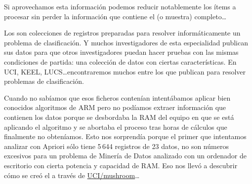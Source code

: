 Si aprovechamos esta información podemos reducir notablemente los ítems a procesar sin perder la información que contiene el \catalogo (o muestra) completo\ldots








%
%
%
%
%
%
%
%
%
%
%
%










Los \catalogos son colecciones de registros preparadas para resolver informáticamente un problema de clasificación. Y muchos investigadores de esta especialidad publican sus datos para que otros investigadores puedan hacer pruebas con las mismas condiciones de partida: una colección de datos con ciertas características. En UCI, KEEL, LUCS\ldots encontraremos muchos \catalogos entre los \datasets que publican para resolver problemas de clasificación.

Cuando no sabíamos que esos ficheros contenían \catalogos intentábamos aplicar bien conocidos algoritmos de ARM pero no podíamos extraer información que contienen los datos porque se desbordaba la RAM del equipo en que se está aplicando el algoritmo y se abortaba el proceso tras horas de cálculos que finalmente no obteníamos. Esto nos sorprendía porque el primer \catalogos que intentamos analizar con Apriori sólo tiene 5\,644 registros de 23 datos, no son números excesivos para un problema de Minería de Datos analizado con un ordenador de escritorio con cierta potencia y capacidad de RAM. Eso nos llevó a descubrir cómo se creó el \catalogos a través de \url{UCI/mushroom}\ldots


